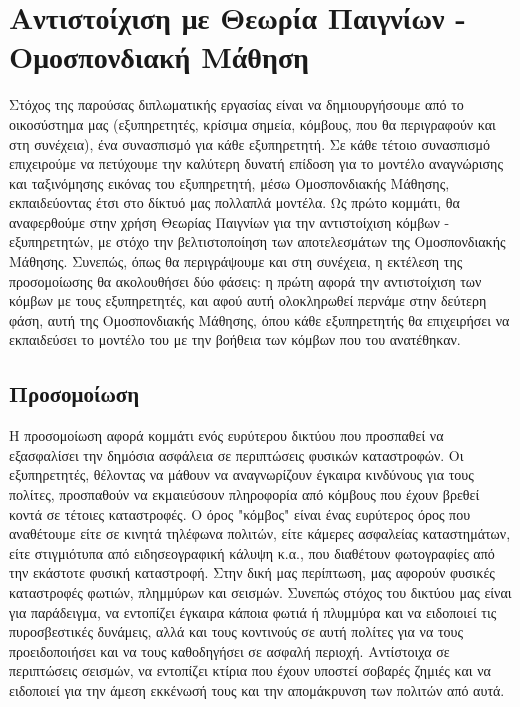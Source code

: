 \chapter{Αντιστοίχιση με Θεωρία Παιγνίων - Ομοσπονδιακή Μάθηση}

Στόχος της παρούσας διπλωματικής εργασίας είναι να δημιουργήσουμε από το οικοσύστημα μας (εξυπηρετητές, κρίσιμα σημεία, κόμβους, που θα περιγραφούν και στη συνέχεια), ένα συνασπισμό για κάθε εξυπηρετητή. Σε κάθε τέτοιο συνασπισμό επιχειρούμε να πετύχουμε την καλύτερη δυνατή επίδοση για το μοντέλο αναγνώρισης και ταξινόμησης εικόνας του εξυπηρετητή, μέσω Ομοσπονδιακής Μάθησης, εκπαιδεύοντας έτσι στο δίκτυό μας πολλαπλά μοντέλα. Ως πρώτο κομμάτι, θα αναφερθούμε στην χρήση Θεωρίας Παιγνίων για την αντιστοίχιση κόμβων - εξυπηρετητών, με στόχο την βελτιστοποίηση των αποτελεσμάτων της Ομοσπονδιακής Μάθησης. Συνεπώς, όπως θα περιγράψουμε και στη συνέχεια, η εκτέλεση της προσομοίωσης θα ακολουθήσει δύο φάσεις: η πρώτη αφορά την αντιστοίχιση των κόμβων με τους εξυπηρετητές, και αφού αυτή ολοκληρωθεί περνάμε στην δεύτερη φάση, αυτή της Ομοσπονδιακής Μάθησης, όπου κάθε εξυπηρετητής θα επιχειρήσει να εκπαιδεύσει το μοντέλο του με την βοήθεια των κόμβων που του ανατέθηκαν.

\section{Προσομοίωση}

Η προσομοίωση αφορά κομμάτι ενός ευρύτερου δικτύου που προσπαθεί να εξασφαλίσει την δημόσια ασφάλεια σε περιπτώσεις φυσικών καταστροφών. Οι εξυπηρετητές, θέλοντας να μάθουν να αναγνωρίζουν έγκαιρα κινδύνους για τους πολίτες, προσπαθούν να εκμαιεύσουν πληροφορία από κόμβους που έχουν βρεθεί κοντά σε τέτοιες καταστροφές. Ο όρος "κόμβος" είναι ένας ευρύτερος όρος που αναθέτουμε είτε σε κινητά τηλέφωνα πολιτών, είτε κάμερες ασφαλείας καταστημάτων, είτε στιγμιότυπα από ειδησεογραφική κάλυψη κ.α., που διαθέτουν φωτογραφίες από την εκάστοτε φυσική καταστροφή. Στην δική μας περίπτωση, μας αφορούν φυσικές καταστροφές φωτιών, πλημμύρων και σεισμών. Συνεπώς στόχος του δικτύου μας είναι για παράδειγμα, να εντοπίζει έγκαιρα κάποια φωτιά ή πλυμμύρα και να ειδοποιεί τις πυροσβεστικές δυνάμεις, αλλά και τους κοντινούς σε αυτή πολίτες για να τους προειδοποιήσει και να τους καθοδηγήσει σε ασφαλή περιοχή. Αντίστοιχα σε περιπτώσεις σεισμών, να εντοπίζει κτίρια που έχουν υποστεί σοβαρές ζημιές και να ειδοποιεί για την άμεση εκκένωσή τους και την απομάκρυνση των πολιτών από αυτά. 

